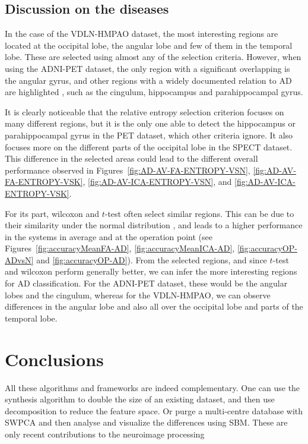\subsection{Discussion on the diseases}
In the case of the VDLN-HMPAO dataset, the most interesting regions are located at the occipital lobe, the angular lobe and few of them in the temporal lobe. These are selected using almost any of the selection criteria. However, when using the ADNI-PET dataset, the only region with a significant overlapping is the angular gyrus, and other regions with a widely documented relation to \ac{AD} are highlighted \cite{Dubois2007,Claus1994}, such as the cingulum, hippocampus and parahippocampal gyrus. 

It is clearly noticeable that the relative entropy selection criterion focuses on many different regions, but it is the only one able to detect the hippocampus or parahippocampal gyrus in the \ac{PET} dataset, which other criteria ignore. It also focuses more on the different parts of the occipital lobe in the \ac{SPECT} dataset. This difference in the selected areas could lead to the different overall performance observed in Figures~\ref{fig:AD-AV-FA-ENTROPY-VSN}, \ref{fig:AD-AV-FA-ENTROPY-VSK}, \ref{fig:AD-AV-ICA-ENTROPY-VSN}, and \ref{fig:AD-AV-ICA-ENTROPY-VSK}.

For its part, wilcoxon and $t$-test often select similar regions. This can be due to their similarity under the normal distribution \cite{Fay10}, and leads to a higher performance in the systems in average and at the operation point (see Figures~\ref{fig:accuracyMeanFA-AD}, \ref{fig:accuracyMeanICA-AD}, \ref{fig:accuracyOP-ADvsN} and \ref{fig:accuracyOP-AD}). From the selected regions, and since $t$-test and wilcoxon perform generally better, we can infer the more interesting regions for \ac{AD} classification. For the ADNI-PET dataset, these would be the angular lobes and the cingulum, whereas for the VDLN-HMPAO, we can observe differences in the angular lobe and also all over the occipital lobe and parts of the temporal lobe. 


\section{Conclusions}


All these algorithms and frameworks are indeed complementary. One can use the synthesis algorithm to double the size of an existing dataset, and then use decomposition to reduce the feature space. Or purge a multi-centre database with \ac{SWPCA} and then analyse and visualize the differences using \ac{SBM}. These are only recent contributions to the neuroimage processing 

